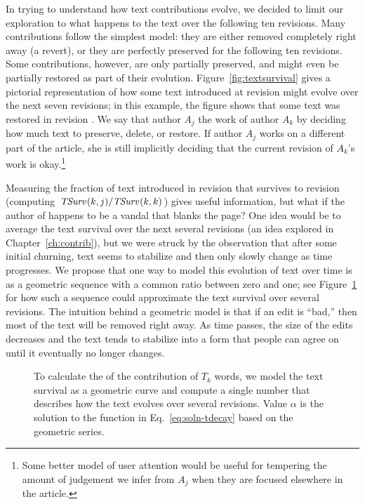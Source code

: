 In trying to understand how text contributions evolve, we decided
to limit our exploration to what happens to the text over the
following ten revisions.
Many contributions follow the simplest model: they are either
removed completely right away (a revert), or they are perfectly
preserved for the following ten revisions.
Some contributions, however, are only partially preserved, and
might even be partially restored as part of their evolution.
Figure~\ref{fig:textsurvival} gives a pictorial representation
of how some text introduced at revision  might
evolve over the next seven revisions; in this example, the
figure shows that some text was restored in revision .
We say that author $A_j$  the work of author
$A_k$ by deciding how much text to preserve, delete, or restore.
If author $A_j$ works on a different part of the article, she
is still implicitly deciding that the current revision of
$A_k$'s work is okay.\footnote{Some better model of
user attention would be useful for tempering the amount
of judgement we infer from
$A_j$ when they are focused elsewhere in the article.}

Measuring the fraction of text introduced in
revision  that survives to revision 
(\ie computing $\mathit{TSurv}_{}(k,j) / \mathit{TSurv}_{}(k,k)$)
gives useful information, but what if the author of  happens to be
a vandal that blanks the page?
One idea would be to average the text survival over the next
several revisions (an idea explored in Chapter~\ref{ch:contrib}),
but we were struck by the observation that after some initial
churning, text seems to stabilize and then only slowly change
as time progresses.
We propose that one way to model this evolution of text over time
is as a geometric sequence with a common ratio between zero and one;
see Figure~\ref{fig:textlongevity} for how such a sequence could
approximate the text survival over several revisions.
The intuition behind a geometric model is that if an edit is
``bad,'' then most of the text will be removed right away.
As time passes, the size of the edits decreases and
the text tends to stabilize into a form
that people can agree on until it eventually no longer changes.


\begin{figure}[tbph]
\centering
{}
\caption[Text longevity is modeled as a geometric curve]
    {To calculate the  of the contribution
    of $T_k$ words, we model the text survival as a geometric curve
    and compute a single number that describes how the text evolves
    over several revisions.
    Value $\alpha$ is the solution to the function in
    Eq.~\ref{eq:soln-tdecay} based on the geometric series.
    }
\label{fig:textlongevity}
\end{figure}

